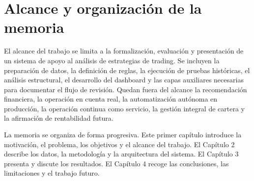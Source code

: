 \section{Alcance y organizaci\'on de la memoria}

El alcance del trabajo se limita a la formalizaci\'on, evaluaci\'on y presentaci\'on
de un sistema de apoyo al an\'alisis de estrategias de trading. Se incluyen la
preparaci\'on de datos, la definici\'on de reglas, la ejecuci\'on de pruebas
hist\'oricas, el an\'alisis estructural, el desarrollo del dashboard y las capas
auxiliares necesarias para documentar el flujo de revisi\'on. Quedan fuera del
alcance la recomendaci\'on financiera, la operaci\'on en cuenta real, la
automatizaci\'on aut\'onoma en producci\'on, la operaci\'on continua como servicio,
la gesti\'on integral de cartera y la afirmaci\'on de rentabilidad futura.

La memoria se organiza de forma progresiva. Este primer cap\'itulo introduce la
motivaci\'on, el problema, los objetivos y el alcance del trabajo. El Cap\'itulo 2
describe los datos, la metodolog\'ia y la arquitectura del sistema. El
Cap\'itulo 3 presenta y discute los resultados. El Cap\'itulo 4 recoge las
conclusiones, las limitaciones y el trabajo futuro.
